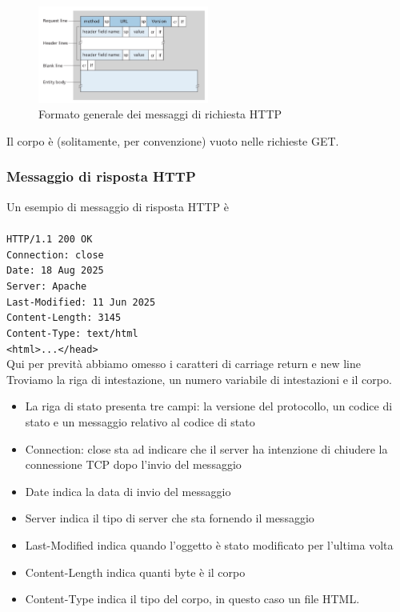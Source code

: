 \documentclass{book}
\begin{document}
\begin{figure}[h]
	\centering
	\includegraphics[width=0.5\textwidth]{images/http_request_message.png}
	\caption{Formato generale dei messaggi di richiesta HTTP}
	\label{fig:esempio}
\end{figure}

Il corpo è (solitamente, per convenzione) vuoto nelle richieste GET.

\subsubsection*{Messaggio di risposta HTTP}
Un esempio di messaggio di risposta HTTP è
\\\\
\texttt{HTTP/1.1 200 OK}\\
\texttt{Connection: close}\\
\texttt{Date: 18 Aug 2025}\\
\texttt{Server: Apache}\\
\texttt{Last-Modified: 11 Jun 2025}\\
\texttt{Content-Length: 3145}\\
\texttt{Content-Type: text/html}\\
\texttt{<html>...</head>}\\

Qui per prevità abbiamo omesso i caratteri di carriage return e new line Troviamo la riga di intestazione, un numero variabile di intestazioni e il corpo.

\begin{itemize}
	\item La riga di stato presenta tre campi: la versione del protocollo, un codice di stato e un messaggio relativo al codice di stato
	\item Connection: close sta ad indicare che il server ha intenzione di chiudere la connessione TCP dopo l'invio del messaggio
	\item Date indica la data di invio del messaggio
	\item Server indica il tipo di server che sta fornendo il messaggio
	\item Last-Modified indica quando l'oggetto è stato modificato per l'ultima volta
	\item Content-Length indica quanti byte è il corpo
	\item Content-Type indica il tipo del corpo, in questo caso un file HTML.
\end{itemize}
\end{document}
